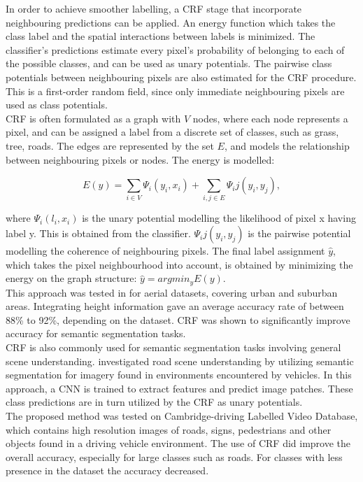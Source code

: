 In order to achieve smoother labelling,  a \ac{CRF} stage that incorporate neighbouring predictions can be applied. An energy function which takes the class label and the spatial interactions between labels is minimized. The classifier's predictions estimate every pixel's probability of belonging to each of the possible classes, and can be used as unary potentials. The pairwise class potentials between neighbouring pixels are also estimated for the \ac{CRF} procedure. This is a first-order random field, since only immediate neighbouring pixels are used as class potentials. \\

\ac{CRF} is often formulated as a graph with $V$ nodes, where each node represents a pixel, and can be assigned a label from a discrete set of classes, such as grass, tree, roads. The edges are represented by the set $E$, and models the relationship between neighbouring pixels or nodes. The energy is modelled:

$$E(y) = \sum\limits_{i\in V} \Psi_i(y_i, x_i) + \sum\limits_{i,j\in E}\Psi_ij(y_i, y_j),$$

where $\Psi_i(l_i, x_i)$ is the unary potential modelling the likelihood of pixel x having label y. This is obtained from the classifier.  $\Psi_ij(y_i, y_j)$ is the pairwise potential modelling the coherence of neighbouring pixels. The final label assignment $\hat{y}$, which takes the pixel neighbourhood into account, is obtained by minimizing the energy on the graph structure:  $\hat{y} =argmin_y E(y)$.\\

This approach was tested in \citep{Kluckner_semantic_height} for aerial datasets, covering urban and suburban areas. Integrating height information gave an average accuracy rate of between 88\% to 92\%, depending on the dataset. \ac{CRF} was shown to significantly improve accuracy for semantic segmentation tasks. \\ 

\ac{CRF} is also commonly used for semantic segmentation tasks involving general scene understanding. \cite{LeCun_semantic} investigated road scene understanding by utilizing semantic segmentation for imagery found in environments encountered by vehicles. In this approach, a \ac{CNN} is trained to extract features and predict image patches. These class predictions are in turn utilized by the \ac{CRF} as unary potentials.\\

The proposed method was tested on Cambridge-driving Labelled Video Database, which contains high resolution images of roads, signs, pedestrians and other objects found in a driving vehicle environment. The use of \ac{CRF} did improve the overall accuracy, especially for large classes such as roads. For classes with less presence in the dataset the accuracy decreased.\\

